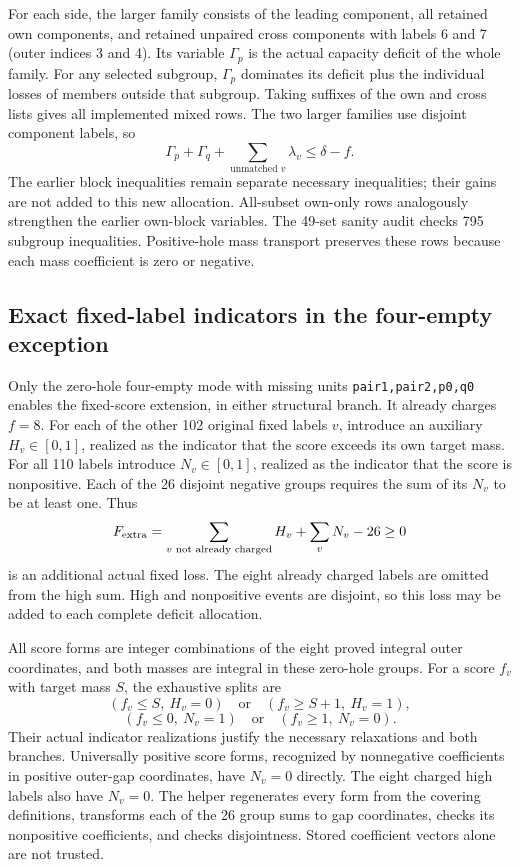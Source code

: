 \documentclass[11pt,a4paper]{article}
\begin{document}
For each side, the larger family consists of the leading component,
all retained own components, and retained unpaired cross components
with labels 6 and 7 (outer indices 3 and 4). Its variable $\Gamma_p$
is the actual capacity deficit of the whole family. For any selected
subgroup, $\Gamma_p$ dominates its deficit plus the individual losses
of members outside that subgroup. Taking suffixes of the own and cross
lists gives all implemented mixed rows. The two larger families use
disjoint component labels, so
\[
 \Gamma_p+\Gamma_q+\sum_{\text{unmatched }v}\lambda_v\le\delta-f.
\]
The earlier block inequalities remain separate necessary inequalities;
their gains are not added to this new allocation. All-subset own-only
rows analogously strengthen the earlier own-block variables. The
49-set sanity audit checks 795 subgroup inequalities. Positive-hole
mass transport preserves these rows because each mass coefficient is
zero or negative.

\subsection{Exact fixed-label indicators in the four-empty exception}
Only the zero-hole four-empty mode with missing units
\texttt{pair1,pair2,p0,q0} enables the fixed-score extension, in either
structural branch. It already charges $f=8$. For each of the other
102 original fixed labels $v$, introduce an auxiliary $H_v\in[0,1]$,
realized as the indicator that the score exceeds its own target mass.
For all 110 labels introduce $N_v\in[0,1]$, realized as the indicator
that the score is nonpositive. Each of the 26 disjoint negative groups
requires the sum of its $N_v$ to be at least one. Thus
\[
 F_{\rm extra}=\sum_{v\text{ not already charged}}H_v+
               \sum_{v}N_v-26\ge0
\]
is an additional actual fixed loss. The eight already charged labels
are omitted from the high sum. High and nonpositive events are disjoint,
so this loss may be added to each complete deficit allocation.

All score forms are integer combinations of the eight proved integral
outer coordinates, and both masses are integral in these zero-hole
groups. For a score $f_v$ with target mass $S$, the exhaustive splits are
\[
 (f_v\le S,\ H_v=0)\quad\text{or}\quad
 (f_v\ge S+1,\ H_v=1),
\]
\[
 (f_v\le0,\ N_v=1)\quad\text{or}\quad
 (f_v\ge1,\ N_v=0).
\]
Their actual indicator realizations justify the necessary relaxations
and both branches. Universally positive score forms, recognized by
nonnegative coefficients in positive outer-gap coordinates, have
$N_v=0$ directly. The eight charged high labels also have $N_v=0$.
The helper  regenerates every form
from the covering definitions, transforms each of the 26 group sums
to gap coordinates, checks its nonpositive coefficients, and checks
disjointness. Stored coefficient vectors alone are not trusted.
\end{document}
